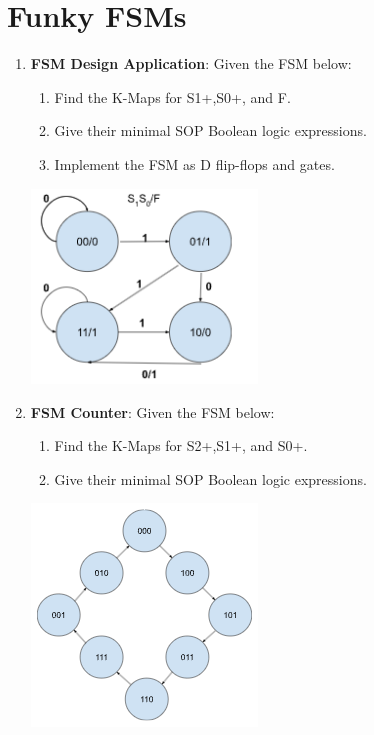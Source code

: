 \documentclass{article}
\begin{document}
\section{Funky FSMs}
    \begin{enumerate}[label=(\alph*)]
        \item \textbf{FSM Design Application}: Given the FSM below:
        \begin{enumerate}[label=(\roman*),nolistsep,itemsep = 60pt]
            \item Find the K-Maps for S1+,S0+, and F.
            \item Give their minimal SOP Boolean logic expressions.
            \item Implement the FSM as D flip-flops and gates.
        \end{enumerate}
        \begin{multicols}{2}
        \begin{center}
        \includegraphics[width=6cm]{figures/FSMDesign.png}
        \end{center}
        \columnbreak
        \end{multicols}
        \newpage

        \item \textbf{FSM Counter}: Given the FSM below:
        \begin{enumerate}[label=(\roman*),nolistsep,itemsep = 60pt]
            \item Find the K-Maps for S2+,S1+, and S0+.
            \item Give their minimal SOP Boolean logic expressions.
        \end{enumerate}
        \begin{multicols}{2}
        \begin{center}
        \includegraphics[width=6cm]{figures/FSMClock.png}
        \end{center}
        \columnbreak
        \end{multicols}


\end{enumerate}
\end{document}

